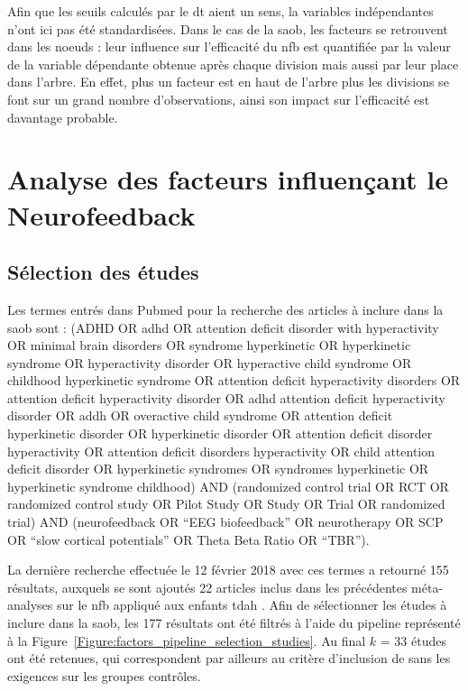 Afin que les seuils calculés par le \gls{dt} aient un sens, la variables indépendantes n'ont ici pas été standardisées. Dans le cas de la \gls{saob}, 
les facteurs se retrouvent dans les noeuds : leur influence sur l'efficacité du \gls{nfb} est quantifiée par la valeur de la variable dépendante 
obtenue après chaque division mais aussi par leur place dans l'arbre. En effet, plus un facteur est en haut de l'arbre plus les divisions se font sur un grand nombre
d'observations, ainsi son impact sur l'efficacité est davantage probable.

\section{Analyse des facteurs influençant le Neurofeedback}

\subsection{Sélection des études}

Les termes entrés dans Pubmed pour la recherche des articles à inclure dans la \gls{saob} sont :
(ADHD OR adhd OR attention deficit disorder with hyperactivity OR minimal brain disorders OR syndrome hyperkinetic OR hyperkinetic
 syndrome OR hyperactivity disorder OR hyperactive child syndrome OR childhood hyperkinetic syndrome OR attention deficit hyperactivity disorders
 OR attention deficit hyperactivity disorder OR adhd attention deficit hyperactivity disorder OR addh OR overactive child syndrome OR attention deficit 
hyperkinetic disorder OR hyperkinetic disorder OR attention deficit disorder hyperactivity OR attention deficit disorders hyperactivity OR child 
attention deficit disorder OR hyperkinetic syndromes OR syndromes hyperkinetic OR hyperkinetic syndrome childhood) AND 
(randomized control trial OR RCT OR randomized control study OR Pilot Study OR Study OR Trial OR randomized trial) AND 
(neurofeedback OR “EEG biofeedback” OR neurotherapy OR SCP OR “slow cortical potentials” OR Theta Beta Ratio OR “TBR”). 

La dernière recherche effectuée le 12 février 2018 avec ces termes a retourné 155 résultats, auxquels se sont ajoutés 22 articles inclus dans les précédentes 
méta-analyses sur le \gls{nfb} appliqué aux enfants \gls{tdah} \citep{Arns2009, Sonuga-Barke2013, Micoulaud2014, Cortese2016, Catala2017}. Afin de sélectionner
les études à inclure dans la \gls{saob}, les 177 résultats ont été filtrés à l'aide du pipeline représenté à la 
Figure~\ref{Figure:factors_pipeline_selection_studies}. Au final $k$ = 33 études ont été retenues, qui correspondent par ailleurs au critère d'inclusion de
\citet{Cortese2016} sans les exigences sur les groupes contrôles. 

